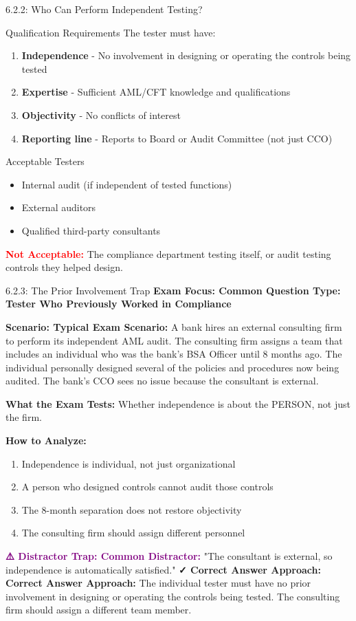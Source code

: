 \documentclass[11pt,a4paper]{beamer}
\newcommand{\redflag}[1]{\textcolor{red}{\textbf{#1}}}
\newcommand{\examfocus}[1]{\textcolor{orange!80!black}{\textbf{Exam Focus: #1}}}
\newcommand{\trap}[1]{\textcolor{purple}{\textbf{⚠️ Distractor Trap: #1}}}
\newcommand{\correct}[1]{\textcolor{green!50!black}{\textbf{✓ Correct Answer Approach: #1}}}
\newcommand{\scenario}[1]{\textcolor{blue!70!black}{\textbf{Scenario: #1}}}
\begin{document}
	\begin{frame}{6.2.2: Who Can Perform Independent Testing?}
		\begin{block}{Qualification Requirements}
			The tester must have:
		\end{block}
		\begin{enumerate}
			\item \textbf{Independence} - No involvement in designing or operating the controls being tested
			\item \textbf{Expertise} - Sufficient AML/CFT knowledge and qualifications
			\item \textbf{Objectivity} - No conflicts of interest
			\item \textbf{Reporting line} - Reports to Board or Audit Committee (not just CCO)
		\end{enumerate}
		\begin{block}{Acceptable Testers}
			\begin{itemize}
				\item Internal audit (if independent of tested functions)
				\item External auditors
				\item Qualified third-party consultants
			\end{itemize}
		\end{block}
		\redflag{Not Acceptable:} The compliance department testing itself, or audit testing controls they helped design.
	\end{frame}
	
	\begin{frame}{6.2.3: The Prior Involvement Trap}
		\examfocus{Common Question Type: Tester Who Previously Worked in Compliance}
		
		\scenario{Typical Exam Scenario:}
		A bank hires an external consulting firm to perform its independent AML audit. The consulting firm assigns a team that includes an individual who was the bank's BSA Officer until 8 months ago. The individual personally designed several of the policies and procedures now being audited. The bank's CCO sees no issue because the consultant is external.
		
		\textbf{What the Exam Tests:} Whether independence is about the PERSON, not just the firm.
		
		\textbf{How to Analyze:}
		\begin{enumerate}
			\item Independence is individual, not just organizational
			\item A person who designed controls cannot audit those controls
			\item The 8-month separation does not restore objectivity
			\item The consulting firm should assign different personnel
		\end{enumerate}
		
		\trap{Common Distractor:} "The consultant is external, so independence is automatically satisfied."
		\correct{Correct Answer Approach:} The individual tester must have no prior involvement in designing or operating the controls being tested. The consulting firm should assign a different team member.
	\end{frame}
	
\end{document}
